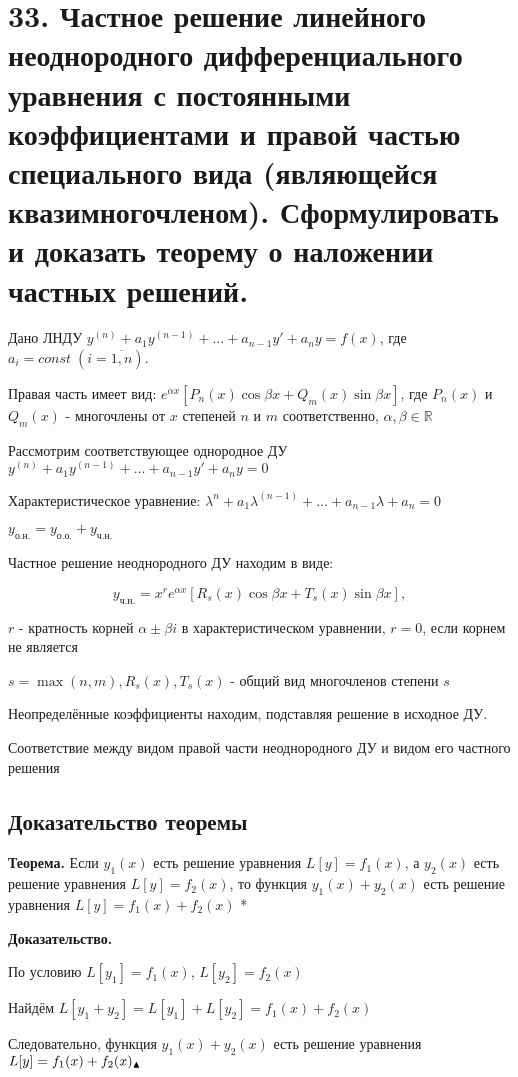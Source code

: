 \documentclass[11pt]{article}
\begin{document}
\section*{33. Частное решение линейного неоднородного дифференциального уравнения с постоянными коэффициентами и правой частью специального вида (являющейся квазимногочленом). Сформулировать и доказать теорему о наложении частных решений.}
\par Дано ЛНДУ $y^{(n)} + a_{1}y^{(n-1)} + \dots + a_{n-1}y' + a_{n}y = f(x)$, где $a_{i} = const \; (i = \overline{1, n})$.
\par Правая часть имеет вид: $e^{\alpha x} [P_{n}(x)\cos\beta x + Q_{m}(x)\sin\beta x]$, где $P_{n}(x)$ и $Q_{m}(x)$ - многочлены от $x$ степеней $n$ и $m$ соответственно, $\alpha, \beta \in \mathbb{R}$
\par Рассмотрим соответствующее однородное ДУ $y^{(n)} + a_{1}y^{(n-1)} + \dots + a_{n-1}y' + a_{n}y = 0$
\par Характеристическое уравнение: $\lambda^{n} + a_{1}\lambda^{(n-1)} + \dots + a_{n-1}\lambda + a_{n} = 0$
\par $y_{\text{о.н.}} = y_{\text{о.о.}} +y_{\text{ч.н.}}$
\par Частное решение неоднородного ДУ находим в виде:
\par $$y_{\text{ч.н.}} = x^{r}e^{\alpha x}[R_{s}(x)\cos\beta x + T_{s}(x)\sin\beta x],$$
\par $r$ - кратность корней $\alpha \pm \beta i$ в характеристическом уравнении, $r = 0$, если корнем не является
\par $s = \max(n, m), R_{s}(x), T_{s}(x)$ - общий вид многочленов степени $s$
\par Неопределённые коэффициенты находим, подставляя решение в исходное ДУ.
\par Соответствие между видом правой части неоднородного ДУ и видом его частного решения

\subsection*{Доказательство теоремы}
\par\textbf{Теорема.} Если $y_{1}(x)$ есть решение уравнения $L[y] = f_{1}(x)$, а $y_{2}(x)$ есть решение уравнения $L[y] = f_{2}(x)$, то функция $y_{1}(x) + y_{2}(x)$ есть решение уравнения $L[y] = f_{1}(x) + f_{2}(x)$
*\par\textbf{Доказательство.}
\par По условию $L[y_1] = f_{1}(x)$, $L[y_2] = f_{2}(x)$
\par Найдём $L[y_{1} + y_{2}] = L[y_{1}] + L[y_{2}] = f_{1}(x) + f_{2}(x)$
\par Следовательно, функция $y_{1}(x) + y_{2}(x)$ есть решение уравнения $L[y] = f_{1}(x) + f_{2}(x)\Large_{\blacktriangle}$
\end{document}
